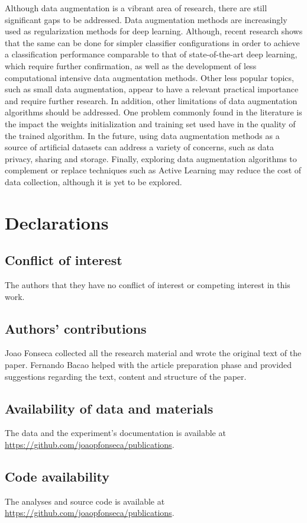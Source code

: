 \documentclass[parskip=full]{scrartcl}
\begin{document}
Although data augmentation is a vibrant area of research, there are still
significant gaps to be addressed. Data augmentation methods are increasingly
used as regularization methods for deep learning. Although, recent research
shows that the same can be done for simpler classifier configurations in order
to achieve a classification performance comparable to that of state-of-the-art
deep learning, which require further confirmation, as well as the development
of less computational intensive data augmentation methods. Other less popular
topics, such as small data augmentation, appear to have a relevant practical
importance and require further research. In addition, other limitations of
data augmentation algorithms should be addressed. One problem commonly found
in the literature is the impact the weights initialization and training set
used have in the quality of the trained algorithm. In the future, using data
augmentation methods as a source of artificial datasets can address a variety
of concerns, such as data privacy, sharing and storage. Finally, exploring
data augmentation algorithms to complement or replace techniques such as
Active Learning may reduce the cost of data collection, although it is yet to
be explored.

\section*{Declarations}

\subsection*{Conflict of interest}

The authors that they have no conflict of interest or competing interest in
this work.

\subsection*{Authors' contributions}

Joao Fonseca collected all the research material and wrote the original text
of the paper. Fernando Bacao helped with the article preparation phase and
provided suggestions regarding the text, content and structure of the paper.

\subsection*{Availability of data and materials}

The data and the experiment's documentation is available at
\href{https://github.com/joaopfonseca/publications}{https://github.com/joaopfonseca/publications}.

\subsection*{Code availability}

The analyses and source code is available at
\href{https://github.com/joaopfonseca/publications}{https://github.com/joaopfonseca/publications}.



\end{document}
